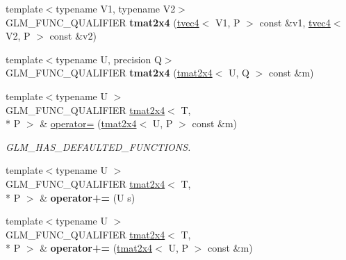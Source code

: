 \begin{DoxyCompactItemize}
\item 
\hypertarget{structglm_1_1tmat2x4_ac88d0804ec99669ad212426a520a6fee}{{\footnotesize template$<$typename V1, typename V2$>$ }\\G\-L\-M\-\_\-\-F\-U\-N\-C\-\_\-\-Q\-U\-A\-L\-I\-F\-I\-E\-R {\bfseries tmat2x4} (\hyperlink{structglm_1_1tvec4}{tvec4}$<$ V1, P $>$ const \&v1, \hyperlink{structglm_1_1tvec4}{tvec4}$<$ V2, P $>$ const \&v2)}\label{structglm_1_1tmat2x4_ac88d0804ec99669ad212426a520a6fee}

\item 
\hypertarget{structglm_1_1tmat2x4_af1c270415a38eaf9a9d62ebf1e5b5ce4}{{\footnotesize template$<$typename U, precision Q$>$ }\\G\-L\-M\-\_\-\-F\-U\-N\-C\-\_\-\-Q\-U\-A\-L\-I\-F\-I\-E\-R {\bfseries tmat2x4} (\hyperlink{structglm_1_1tmat2x4}{tmat2x4}$<$ U, Q $>$ const \&m)}\label{structglm_1_1tmat2x4_af1c270415a38eaf9a9d62ebf1e5b5ce4}

\item 
\hypertarget{structglm_1_1tmat2x4_abc6565efeca20fb615abcc146b78efa2}{{\footnotesize template$<$typename U $>$ }\\G\-L\-M\-\_\-\-F\-U\-N\-C\-\_\-\-Q\-U\-A\-L\-I\-F\-I\-E\-R \hyperlink{structglm_1_1tmat2x4}{tmat2x4}$<$ T, \\*
P $>$ \& \hyperlink{structglm_1_1tmat2x4_abc6565efeca20fb615abcc146b78efa2}{operator=} (\hyperlink{structglm_1_1tmat2x4}{tmat2x4}$<$ U, P $>$ const \&m)}\label{structglm_1_1tmat2x4_abc6565efeca20fb615abcc146b78efa2}

\begin{DoxyCompactList}\small\item\em G\-L\-M\-\_\-\-H\-A\-S\-\_\-\-D\-E\-F\-A\-U\-L\-T\-E\-D\-\_\-\-F\-U\-N\-C\-T\-I\-O\-N\-S. \end{DoxyCompactList}\item 
\hypertarget{structglm_1_1tmat2x4_a9acecf4bd516667aff87e24d998abdbe}{{\footnotesize template$<$typename U $>$ }\\G\-L\-M\-\_\-\-F\-U\-N\-C\-\_\-\-Q\-U\-A\-L\-I\-F\-I\-E\-R \hyperlink{structglm_1_1tmat2x4}{tmat2x4}$<$ T, \\*
P $>$ \& {\bfseries operator+=} (U s)}\label{structglm_1_1tmat2x4_a9acecf4bd516667aff87e24d998abdbe}

\item 
\hypertarget{structglm_1_1tmat2x4_aba7049b76997321c5966fcfb72d2655d}{{\footnotesize template$<$typename U $>$ }\\G\-L\-M\-\_\-\-F\-U\-N\-C\-\_\-\-Q\-U\-A\-L\-I\-F\-I\-E\-R \hyperlink{structglm_1_1tmat2x4}{tmat2x4}$<$ T, \\*
P $>$ \& {\bfseries operator+=} (\hyperlink{structglm_1_1tmat2x4}{tmat2x4}$<$ U, P $>$ const \&m)}\label{structglm_1_1tmat2x4_aba7049b76997321c5966fcfb72d2655d}


\end{DoxyCompactItemize}
